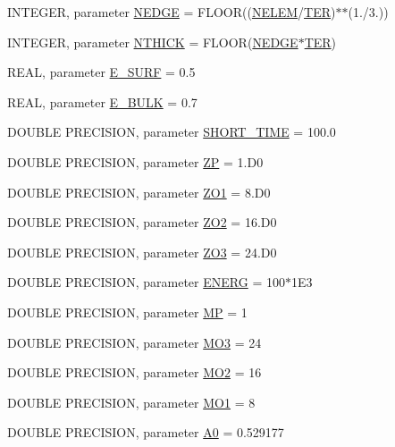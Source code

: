 \begin{DoxyCompactItemize}
\item 
INTEGER, parameter \hyperlink{namespaceparameters_a3f72bf9fb376fde5e0eaf3da242d4f06}{NEDGE} = FLOOR((\hyperlink{namespaceparameters_a20c80b2e34c240feef7ac6887646115d}{NELEM}/\hyperlink{namespaceparameters_adc91f63a6d2c197941c445a5d64800a3}{TER})$\ast$$\ast$(1./3.))
\item 
INTEGER, parameter \hyperlink{namespaceparameters_adf37b75c4792b28d45484737d230ead3}{NTHICK} = FLOOR(\hyperlink{namespaceparameters_a3f72bf9fb376fde5e0eaf3da242d4f06}{NEDGE}$\ast$\hyperlink{namespaceparameters_adc91f63a6d2c197941c445a5d64800a3}{TER})
\item 
REAL, parameter \hyperlink{namespaceparameters_a10dd39ec5aeb14b9a104618dc6ef5450}{E\_\-SURF} = 0.5
\item 
REAL, parameter \hyperlink{namespaceparameters_a485a71bfcc9a08ed577efe9a5df5735b}{E\_\-BULK} = 0.7
\item 
DOUBLE PRECISION, parameter \hyperlink{namespaceparameters_a8b8f35affe261eb9ad1a1612ca3572a7}{SHORT\_\-TIME} = 100.0
\item 
DOUBLE PRECISION, parameter \hyperlink{namespaceparameters_af5f3e31c772340991fe768468c6a0dad}{ZP} = 1.D0
\item 
DOUBLE PRECISION, parameter \hyperlink{namespaceparameters_a1c9d90c36ce0be5595ed197469b6e609}{ZO1} = 8.D0
\item 
DOUBLE PRECISION, parameter \hyperlink{namespaceparameters_a885e127ecd6c6a8469ca5ed6aba4badf}{ZO2} = 16.D0
\item 
DOUBLE PRECISION, parameter \hyperlink{namespaceparameters_ac4b8f44af44db753a988dc78c534c94d}{ZO3} = 24.D0
\item 
DOUBLE PRECISION, parameter \hyperlink{namespaceparameters_a3a8aa693f08c619d7a21b16784fc6cfe}{ENERG} = 100$\ast$1E3
\item 
DOUBLE PRECISION, parameter \hyperlink{namespaceparameters_a55c34135e7a3b750b692c7fe5c44d996}{MP} = 1
\item 
DOUBLE PRECISION, parameter \hyperlink{namespaceparameters_a9fe3ba34735e9bd271a5dfa94242d60f}{MO3} = 24
\item 
DOUBLE PRECISION, parameter \hyperlink{namespaceparameters_a8f3ca9bcf2af3dccca1f89e678dd9149}{MO2} = 16
\item 
DOUBLE PRECISION, parameter \hyperlink{namespaceparameters_a6d254c62ce30ae2227377164deadbabe}{MO1} = 8
\item 
DOUBLE PRECISION, parameter \hyperlink{namespaceparameters_a04ab380d92467d452e23f88704ceb37a}{A0} = 0.529177
$$
\end{DoxyCompactItemize}
